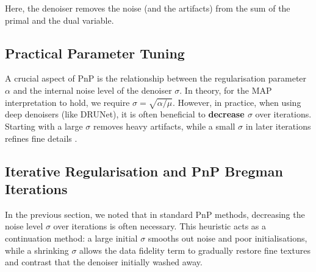 Here, the denoiser removes the noise (and the artifacts) from the sum of the primal and the dual variable.

\subsection{Practical Parameter Tuning}
A crucial aspect of PnP is the relationship between the regularisation parameter $\alpha$ and the internal noise level of the denoiser $\sigma$. In theory, for the MAP interpretation to hold, we require $\sigma = \sqrt{\alpha/\mu}$. However, in practice, when using deep denoisers (like DRUNet), it is often beneficial to \textbf{decrease $\sigma$} over iterations. Starting with a large $\sigma$ removes heavy artifacts, while a small $\sigma$ in later iterations refines fine details \cite{zhang2021plug}.

\subsection{Iterative Regularisation and PnP Bregman Iterations}
\label{sec:pnp_bregman}

In the previous section, we noted that in standard PnP methods, decreasing the noise level $\sigma$ over iterations is often necessary. This heuristic acts as a continuation method: a large initial $\sigma$ smooths out noise and poor initialisations, while a shrinking $\sigma$ allows the data fidelity term to gradually restore fine textures and contrast that the denoiser initially washed away. 

